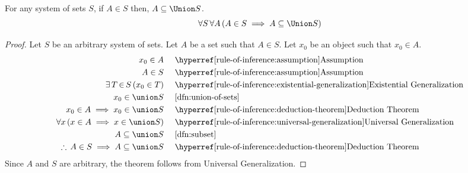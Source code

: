 \begin{thm}
    \label{thm:every-member-of-a-system-of-sets-is-a-subset-of-the-union}
    For any system of sets \( S \), if \( A \in S \) then, \( A \subseteq \Union S \).
    \begin{equation*}
        \forall S \, \forall A \, \mleft( A \in S \implies A \subseteq \Union S \mright)
    \end{equation*}
\end{thm}

\begin{proof}
    Let \( S \) be an arbitrary system of sets. Let \( A \) be a set such that \( A \in S \).
    Let \( x_{0} \) be an object such that \( x_{0} \in A \).
    \begin{equation*}
        \begin{aligned}
            x_{0} \in A& \\
            A \in S& \\
            \exists \, T \,{\in}\, S \, \mleft( x_{0} \in T \mright)& \\
            x_{0} \in \union S& \\
            x_{0} \in A \implies x_{0} \in \union S& \\
            \forall x \, \mleft( x \in A \implies x \in \union S \mright)& \\
            A \subseteq \union S& \\
            \therefore \, A \in S \implies A \subseteq \union S& \\
        \end{aligned}
        \text{  }
        \begin{aligned}
            &\quad\text{\aref{rule-of-inference:assumption}{Assumption}}\\
            &\quad\text{\aref{rule-of-inference:assumption}{Assumption}} \\
            &\quad\text{\aref{rule-of-inference:existential-generalization}{Existential Generalization}}\\
            &\quad\text{\cref{dfn:union-of-sets}}\\
            &\quad\text{\aref{rule-of-inference:deduction-theorem}{Deduction Theorem}}\\
            &\quad\text{\aref{rule-of-inference:universal-generalization}{Universal Generalization}}\\
            &\quad\text{\cref{dfn:subset}}\\
            &\quad\text{\aref{rule-of-inference:deduction-theorem}{Deduction Theorem}}
        \end{aligned}
    \end{equation*}
    Since \( A \) and \( S \) are arbitrary, the theorem follows from Universal
    Generalization.
\end{proof}

